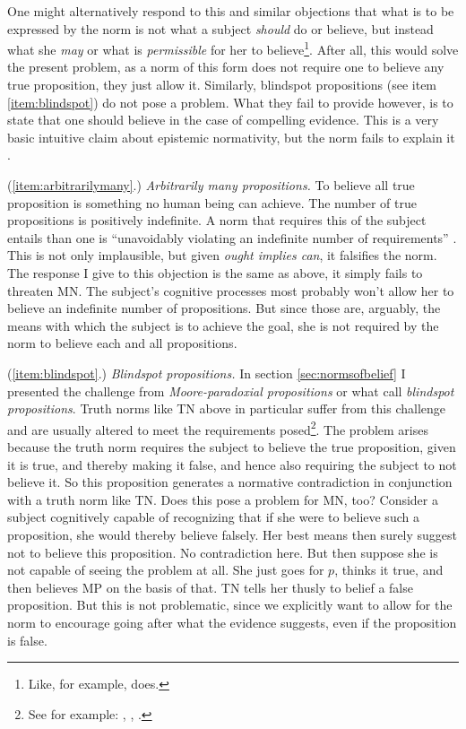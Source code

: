 \documentclass[12pt,numbers=noenddot]{scrartcl}
\begin{document}
One might alternatively respond to this and similar objections that what is to be expressed by the norm is not what a subject \emph{should} do or believe, but instead what she \emph{may} or what is \emph{permissible} for her to believe\footnote{Like, for example, \textcite{Whiting2013-WHITTA-3} does.}. After all, this would solve the present problem, as a norm of this form does not require one to believe any true proposition, they just allow it. Similarly, blindspot propositions (see item \ref{item:blindspot}) do not pose a problem. What they fail to provide however, is to state that one should believe in the case of compelling evidence. This is a very basic intuitive claim about epistemic normativity, but the norm fails to explain it \textcite[18]{Mchugh2012-MCHTTN}.

(\ref{item:arbitrarilymany}.) \emph{Arbitrarily many propositions.}
To believe all true proposition is something no human being can achieve. The number of true propositions is positively indefinite. A norm that requires this of the subject entails than one is “unavoidably violating an indefinite number of requirements” \autocite[12]{Mchugh2012-MCHTTN}. This is not only implausible, but given \emph{ought implies can}, it falsifies the norm. The response I give to this objection is the same as above, it simply fails to threaten MN. The subject's cognitive processes most probably won't allow her to believe an indefinite number of propositions. But since those are, arguably, the means with which the subject is to achieve the goal, she is not required by the norm to believe each and all propositions.

(\ref{item:blindspot}.) \emph{Blindspot propositions.}
In section \ref{sec:normsofbelief} I presented the challenge from \emph{Moore-paradoxial propositions} or what \textcite[281]{Bykvist2007-BYKDTI} call \emph{blindspot propositions}. Truth norms like TN above in particular suffer from this challenge and are usually altered to meet the requirements posed\footnote{See for example: \textcite[282]{Bykvist2007-BYKDTI}, \textcite[12]{Mchugh2012-MCHTTN}, \textcite[6]{Greenberg2016-GREITN}.}. The problem arises because the truth norm requires the subject to believe the true proposition, given it is true, and thereby making it false, and hence also requiring the subject to not believe it. So this proposition generates a normative contradiction in conjunction with a truth norm like TN. Does this pose a problem for MN, too? Consider a subject cognitively capable of recognizing that if she were to believe such a proposition, she would thereby believe falsely. Her best means then surely suggest not to believe this proposition. No contradiction here. But then suppose she is not capable of seeing the problem at all. She just goes for $p$, thinks it true, and then believes MP on the basis of that. TN tells her thusly to belief a false proposition. But this is not problematic, since we explicitly want to allow for the norm to encourage going after what the evidence suggests, even if the proposition is false.
\end{document}
